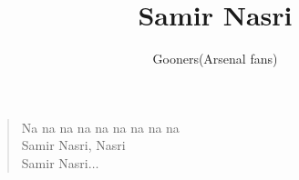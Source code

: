 \documentclass[a4paper,12pt]{article}
\title{Samir Nasri}
\author{Gooners(Arsenal fans)}
\date{}
\begin{document}
	
	\maketitle
	
	\begin{verse}
		
		Na na na na na na na na na \\
		Samir Nasri, Nasri \\
		Samir Nasri$\ldots$
		
	\end{verse}
	
\end{document}
